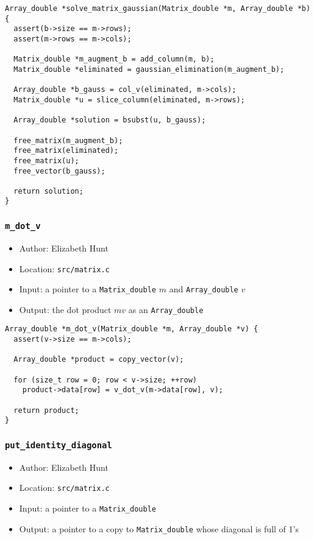 \documentclass[11pt]{article}
\begin{document}
\begin{verbatim}
Array_double *solve_matrix_gaussian(Matrix_double *m, Array_double *b) {
  assert(b->size == m->rows);
  assert(m->rows == m->cols);

  Matrix_double *m_augment_b = add_column(m, b);
  Matrix_double *eliminated = gaussian_elimination(m_augment_b);

  Array_double *b_gauss = col_v(eliminated, m->cols);
  Matrix_double *u = slice_column(eliminated, m->rows);

  Array_double *solution = bsubst(u, b_gauss);

  free_matrix(m_augment_b);
  free_matrix(eliminated);
  free_matrix(u);
  free_vector(b_gauss);

  return solution;
}
\end{verbatim}


\subsubsection{\texttt{m\_dot\_v}}
\label{sec:org83c8351}
\begin{itemize}
\item Author: Elizabeth Hunt
\item Location: \texttt{src/matrix.c}
\item Input: a pointer to a \texttt{Matrix\_double} \(m\) and \texttt{Array\_double} \(v\)
\item Output: the dot product \(mv\) as an \texttt{Array\_double}
\end{itemize}

\begin{verbatim}
Array_double *m_dot_v(Matrix_double *m, Array_double *v) {
  assert(v->size == m->cols);

  Array_double *product = copy_vector(v);

  for (size_t row = 0; row < v->size; ++row)
    product->data[row] = v_dot_v(m->data[row], v);

  return product;
}
\end{verbatim}

\subsubsection{\texttt{put\_identity\_diagonal}}
\label{sec:orge3fcb3e}
\begin{itemize}
\item Author: Elizabeth Hunt
\item Location: \texttt{src/matrix.c}
\item Input: a pointer to a \texttt{Matrix\_double}
\item Output: a pointer to a copy to \texttt{Matrix\_double} whose diagonal is full of 1's
\end{itemize}
\end{document}
